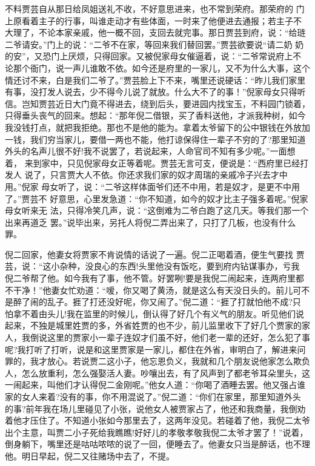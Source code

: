 不料贾芸自从那日给凤姐送礼不收，不好意思进来，也不常到荣府。那荣府的
门上原看着主子的行事，叫谁走动才有些体面，一时来了他便进去通报；若主子不
大理了，不论本家亲戚，他一概不回，支回去就完事。那日贾芸到府，说：“给琏
二爷请安。”门上的说：“二爷不在家，等回来我们替回罢。”贾芸欲要说“请二奶
奶的安”，又恐门上厌烦，只得回家。又被倪家母女催逼着，说：“二爷常说府上不
论那个衙门，说一声儿谁敢不依。如今还是府里的一家儿，又不为什么大事，这个
情还讨不来，白是我们二爷了。”贾芸脸上下不来，嘴里还说硬话：“昨儿我们家里
有事，没打发人说去，少不得今儿说了就放。什么大不了的事！”倪家母女只得听
信。岂知贾芸近日大门竟不得进去，绕到后头，要进园内找宝玉，不料园门锁着，
只得垂头丧气的回来。想起：“那年倪二借银，买了香料送他，才派我种树，如今
我没钱打点，就把我拒绝。那也不是他的能为。拿着太爷留下的公中银钱在外放加
一钱，我们穷当家儿，要借一两也不能，他打谅保得住一辈子不穷的了?那里知道
外头的名声儿很不好!我不说罢了，若说起来，人命官司不知有多少呢。”一面想着，
来到家中，只见倪家母女正等着呢。贾芸无言可支，便说是：“西府里已经打发人
说了，只言贾大人不依。你还求我们家的奴才周瑞的亲戚冷子兴去才中用。”倪家
母女听了，说：“二爷这样体面爷们还不中用，若是奴才，是更不中用了。”贾芸不
好意思，心里发急道：“你不知道，如今的奴才比主子强多着呢。”倪家母女听来无
法，只得冷笑几声，说：“这倒难为二爷白跑了这几天。等我们那一个出来再道乏
罢。”说毕出来，另托人将倪二弄出来了，只打了几板，也没有什么罪。

倪二回家，他妻女将贾家不肯说情的话说了一遍。倪二正喝着酒，便生气要找
贾芸，说：“这小杂种，没良心的东西!头里他没有饭吃，要到府内钻谋事办，亏我
倪二爷帮了他。如今我有了事，他不管。好罢咧!要是我倪二闹起来，连两府里都
不干净！”他妻女忙劝道：“嗳，你又喝了黄汤，就是这么有天没日头的。前儿可不
是醉了闹的乱子。捱了打还没好呢，你又闹了。”倪二道：“捱了打就怕他不成?只
怕拿不着由头儿!我在监里的时候儿，倒认得了好几个有义气的朋友。听见他们说
起来，不独是城里姓贾的多，外省姓贾的也不少，前儿监里收下了好几个贾家的家
人，我倒说这里的贾家小一辈子连奴才们虽不好，他们老一辈的还好，怎么犯了事
呢?我打听了打听，说是和这里贾家是一家儿，都住在外省，审明白了，解进来问
罪的，我才放心。若说贾二这小子，他忘恩负义，我就和几个朋友说他家怎么欺负
人，怎么放重利，怎么强娶活人妻。吵嚷出去，有了风声到了都老爷耳朵里头，这
一闹起来，叫他们才认得倪二金刚呢。”他女人道：“你喝了酒睡去罢。他又强占谁
家的女人来着?没有的事，你不用混说了。”倪二道：“你们在家里，那里知道外头
的事?前年我在场儿里碰见了小张，说他女人被贾家占了，他还和我商量，我倒劝
着他才压住了。不知道小张如今那里去了，这两年没见。若碰着了他，我倪二太爷
出个主意，叫贾二小子死给我瞧瞧!好好儿的孝敬孝敬我倪二太爷才罢了！”说着，
倒身躺下，嘴里还是咕咕哝哝的说了一回，便睡去了。他妻女只当是醉话，也不理
他。明日早起，倪二又往赌场中去了，不提。

